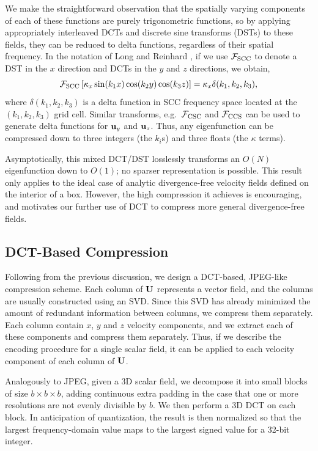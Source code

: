 We make the straightforward observation that the spatially varying components of each of these functions are purely trigonometric functions, so by applying appropriately interleaved DCTs and discrete sine transforms (DSTs) to these fields, they can be reduced to delta functions, regardless of their spatial frequency. In the notation of Long and Reinhard \cite{long2009}, if we use $\mathcal{F}_\textrm{SCC}$ to denote a DST in the $x$ direction and DCTs in the $y$ and $z$ directions, we obtain,
\begin{equation}
\mathcal{F}_\textrm{SCC}\left[\kappa_x\sin(k_1 x) \cos(k_2 y) \cos(k_3 z)\right] = \kappa_x\delta(k_1, k_2, k_3),
\end{equation}
where $\delta(k_1, k_2, k_3)$ is a delta function in SCC frequency space located at the $(k_1, k_2, k_3)$ grid cell. Similar transforms, e.g.~$\mathcal{F}_\textrm{CSC}$ and $\mathcal{F}_\textrm{CCS}$ can be used to generate delta functions for $\mathbf{u}_y$ and $\mathbf{u}_z$. Thus, any eigenfunction can be compressed down to three integers (the $k_i$s) and three floats (the $\kappa$ terms).

Asymptotically, this mixed DCT/DST losslessly transforms an $O(N)$ eigenfunction down to $O(1)$; no sparser representation is possible. This result only applies to the ideal case of analytic divergence-free velocity fields defined on the interior of a box. However, the high compression it achieves is encouraging, and motivates our further use of DCT to compress more general divergence-free fields.

\subsection{DCT-Based Compression}

Following from the previous discussion, we design a DCT-based, JPEG-like compression scheme. Each column of $\mathbf{U}$ represents a vector field, and the columns are usually constructed using an SVD. Since this SVD has already minimized the amount of redundant information between columns, we compress them separately. Each column contain $x$, $y$ and $z$ velocity components, and we extract each of these components and compress them separately. Thus, if we describe the encoding procedure for a single scalar field, it can be applied to each velocity component of each column of $\mathbf{U}$.

Analogously to JPEG, given a 3D scalar field, we decompose it into small blocks of size $b \times b \times b$, adding continuous extra padding in the case that one or more resolutions are not evenly divisible by $b$. We then perform a 3D DCT on each block. In anticipation of quantization, the result is then normalized so that the largest frequency-domain value maps to the largest signed value for a 32-bit integer.

